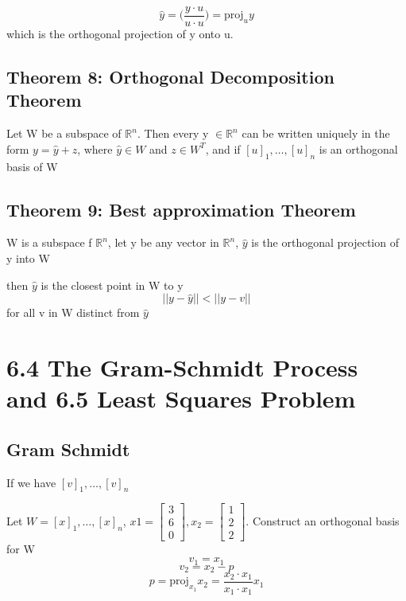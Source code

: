 \begin{equation}
	\label{}
	\hat y = \bigl(\frac{y\cdot u}{u\cdot u}\bigr)=\mbox{proj}_{u}y
\end{equation} which is the orthogonal projection of y onto u. 


\subsection{Theorem 8: Orthogonal Decomposition Theorem}
Let W be a subspace of $\mathbb{R}^{n}$. Then every y $\in\mathbb{R}^{n}$ can be written uniquely in the form $y=\hat y+z$, where $\hat y \in W$ and $z\in W^{T}$, and if $[u]_{1},\ldots,[u]_{n}$ is an orthogonal basis of W


\subsection{Theorem 9: Best approximation Theorem}
W is a subspace f $\mathbb{R}^{n}$, let y be any vector in $\mathbb{R}^{n}$, $\hat y$ is the orthogonal projection of y into W

then $\hat y$ is the closest point in W to y
\begin{equation}
	\label{}
||y-\hat y|| < ||y-v||	
\end{equation}
for all v in W distinct from $\hat y$


\section{6.4 The Gram-Schmidt Process and 6.5 Least Squares Problem}
\subsection{Gram Schmidt}

If we have $[v]_{1},\ldots,[v]_{n}$ 

Let $W=[x]_{1},\ldots,[x]_{n}$, $x1=
\begin{bmatrix}
3\\6\\0	
\end{bmatrix}, x_{2}=
\begin{bmatrix}
1\\2\\2	
\end{bmatrix}$. Construct an orthogonal basis for W
\begin{equation}
	\label{}
v_{1}=x_{1}	
\end{equation}
\begin{equation}
	\label{}
v_{2}=x_{2}-p	
\end{equation}
\begin{equation}
	\label{}
	p=\mbox{proj}_{x_{1}}x_{2}=\frac{x_{2}\cdot x_{1}}{x_{1}\cdot x_{1}}x_{1}
\end{equation}





